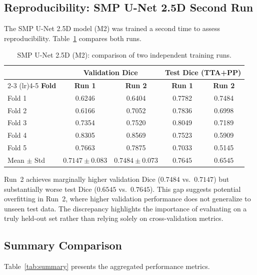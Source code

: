 \documentclass[11pt,a4paper]{article}
\begin{document}
\subsection{Reproducibility: SMP U-Net 2.5D Second Run}

The SMP U-Net 2.5D model (M2) was trained a second time to assess reproducibility. Table~\ref{tab:m2_runs} compares both runs.

\begin{table}[H]
\centering
\caption{SMP U-Net 2.5D (M2): comparison of two independent training runs.}
\label{tab:m2_runs}
\begin{tabular}{lcccc}
\toprule
& \multicolumn{2}{c}{\textbf{Validation Dice}} & \multicolumn{2}{c}{\textbf{Test Dice (TTA+PP)}} \\
\cmidrule(lr){2-3} \cmidrule(lr){4-5}
\textbf{Fold} & \textbf{Run 1} & \textbf{Run 2} & \textbf{Run 1} & \textbf{Run 2} \\
\midrule
Fold 1 & 0.6246 & 0.6404 & 0.7782 & 0.7484 \\
Fold 2 & 0.6166 & 0.7052 & 0.7836 & 0.6998 \\
Fold 3 & 0.7354 & 0.7520 & 0.8049 & 0.7189 \\
Fold 4 & 0.8305 & 0.8569 & 0.7523 & 0.5909 \\
Fold 5 & 0.7663 & 0.7875 & 0.7033 & 0.5145 \\
\midrule
Mean $\pm$ Std & $0.7147 \pm 0.083$ & $0.7484 \pm 0.073$ & $0.7645$ & $0.6545$ \\
\bottomrule
\end{tabular}
\end{table}

Run~2 achieves marginally higher validation Dice ($0.7484$ vs.\ $0.7147$) but substantially worse test Dice ($0.6545$ vs.\ $0.7645$). This gap suggests potential overfitting in Run~2, where higher validation performance does not generalize to unseen test data. The discrepancy highlights the importance of evaluating on a truly held-out set rather than relying solely on cross-validation metrics.

\subsection{Summary Comparison}

Table~\ref{tab:summary} presents the aggregated performance metrics.
\end{document}
